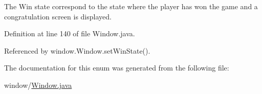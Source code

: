 The Win state correspond to the state where the player has won the game and a congratulation screen is displayed. 



Definition at line 140 of file Window.\-java.



Referenced by window.\-Window.\-set\-Win\-State().



The documentation for this enum was generated from the following file\-:\begin{DoxyCompactItemize}
\item 
window/\hyperlink{_window_8java}{Window.\-java}\end{DoxyCompactItemize}
